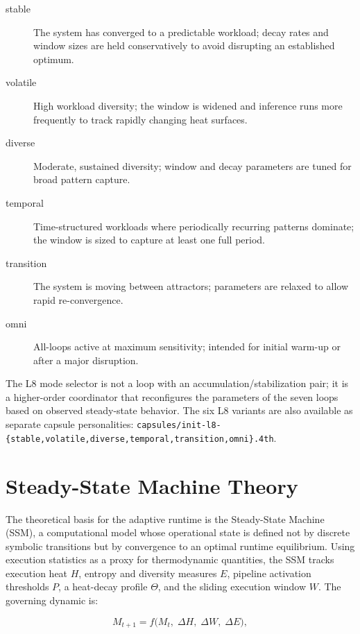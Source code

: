 \begin{description}
  \item[stable] The system has converged to a predictable workload; decay
    rates and window sizes are held conservatively to avoid disrupting an
    established optimum.
  \item[volatile] High workload diversity; the window is widened and
    inference runs more frequently to track rapidly changing heat surfaces.
  \item[diverse] Moderate, sustained diversity; window and decay parameters
    are tuned for broad pattern capture.
  \item[temporal] Time-structured workloads where periodically recurring
    patterns dominate; the window is sized to capture at least one full
    period.
  \item[transition] The system is moving between attractors; parameters are
    relaxed to allow rapid re-convergence.
  \item[omni] All-loops active at maximum sensitivity; intended for initial
    warm-up or after a major disruption.
\end{description}

The L8 mode selector is not a loop with an accumulation/stabilization pair;
it is a higher-order coordinator that reconfigures the parameters of the
seven loops based on observed steady-state behavior. The six L8 variants are
also available as separate capsule personalities:
\texttt{capsules/init-l8-\{stable,volatile,diverse,temporal,transition,omni\}.4th}.

\section{Steady-State Machine Theory}
\label{vol1:sec:physics:ssm}


The theoretical basis for the adaptive runtime is the Steady-State Machine
(SSM), a computational model whose operational state is defined not by discrete
symbolic transitions but by convergence to an optimal runtime equilibrium.
Using execution statistics as a proxy for thermodynamic quantities, the SSM
tracks execution heat $H$, entropy and diversity measures $E$, pipeline
activation thresholds $P$, a heat-decay profile $\Theta$, and the sliding
execution window $W$. The governing dynamic is:

\begin{equation}
M_{t+1} = f\!\bigl(M_t,\; \Delta H,\; \Delta W,\; \Delta E\bigr),
\end{equation}

